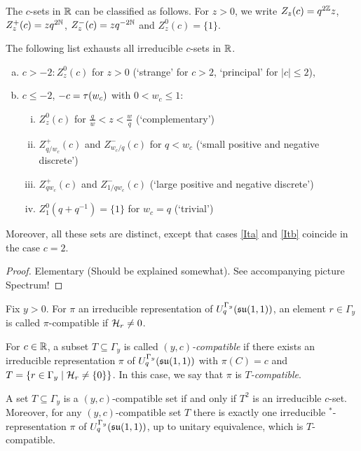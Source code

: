 The $c$-sets in $\mathbb{R}$ can be classified as follows. For $z>0$, we write $Z_z(c) = q^{2\mathbb{Z}}z$, $Z_z^+(c) = zq^{2\mathbb{N}}$, $Z_{z}^{-}(c) = zq^{-2\mathbb{N}}$ and $Z_z^{0}(c) = \{1\}$.

\begin{Prop}\label{PropClass1D} The following list exhausts all
  irreducible $c$-sets in $\mathbb{R}$.
\begin{enumerate}[a)] 
\item $c>-2: Z_z^0(c)$ for $z>0$ (`strange' for $c>2$, `principal' for $|c|\leq 2$),
\item $c \leq -2$, $-c=\operatorname{\tau}(w_c)$ with $0 < w_c\leq 1$:
\begin{enumerate}[(i)]
\item $Z_z^0(c)$ for $\frac{q}{w}<z<\frac{w}{q}$ (`complementary')
\item\label{Ita} $Z_{q/w_c}^+(c)$ and $Z_{w_c/q}^-(c)$ for $q<w_c$ (`small positive and negative discrete')
\item\label{Itb} $Z_{qw_c}^+(c)$ and $Z_{1/qw_c}^-(c)$ (`large positive and negative discrete')
\item $Z_1^0(q+q^{-1})=\{1\}$ for $w_c=q$ (`trivial')
\end{enumerate}
\end{enumerate}
Moreover, all these sets are distinct, except that cases \eqref{Ita} and \eqref{Itb} coincide in the case $c=2$.
\end{Prop} 

\begin{proof} Elementary (Should be explained somewhat). See accompanying picture Spectrum!
\end{proof} 




\begin{Def} Fix $y>0$. For $\pi$ an irreducible representation of $U_q^{\Gamma_y}(\mathfrak{su}(1,1))$, an element $r\in \Gamma_y$ is called $\pi$-compatible if $\mathcal{H}_r\neq 0$. 

For $c\in \mathbb{R}$, a subset $T\subseteq \Gamma_y$ is called \emph{$(y,c)$-compatible} if there exists an irreducible representation $\pi$ of $U_q^{\Gamma_y}(\mathfrak{su}(1,1))$ with $\pi(C) = c$ and $T=\{r\in \Gamma_y\mid \mathcal{H}_{r}\neq \{0\}\}$. In this case, we say that $\pi$ is \emph{$T$-compatible}.
\end{Def}

\begin{Prop}\label{PropClassRep} A set $T\subseteq \Gamma_y$ is a $(y,c)$-compatible set if and only if $T^2$ is an irreducible $c$-set. Moreover, for any $(y,c)$-compatible set $T$ there is exactly one irreducible $^*$-representation $\pi$ of $U_q^{\Gamma_y}(\mathfrak{su}(1,1))$, up to unitary equivalence, which is $T$-compatible.
\end{Prop}


